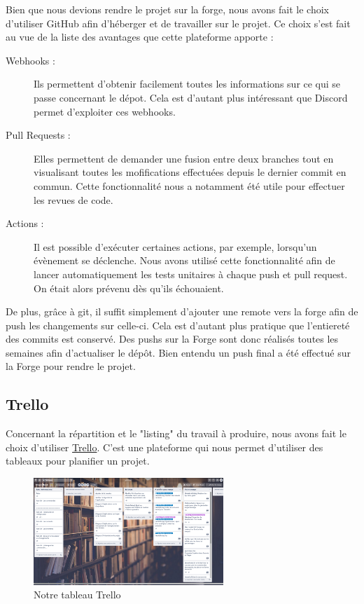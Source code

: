 			Bien que nous devions rendre le projet sur la forge, nous avons fait le choix d'utiliser GitHub afin d'héberger et de travailler sur le projet. Ce choix s'est fait au vue de la liste des avantages que cette plateforme apporte :

			\begin{description}
				\item[Webhooks :]{Ils permettent d'obtenir facilement toutes les informations sur ce qui se passe concernant le dépot. Cela est d'autant plus intéressant que Discord permet d'exploiter ces webhooks.}
				\item[Pull Requests :]{Elles permettent de demander une fusion entre deux branches tout en visualisant toutes les mofifications effectuées depuis le dernier commit en commun. Cette fonctionnalité nous a notamment été utile pour effectuer les revues de code.}
				\item[Actions :]{Il est possible d'exécuter certaines actions, par exemple, lorsqu'un évènement se déclenche. Nous avons utilisé cette fonctionnalité afin de lancer automatiquement les tests unitaires à chaque push et pull request. On était alors prévenu dès qu'ils échouaient.}
			\end{description}

			De plus, grâce à git, il suffit simplement d'ajouter une remote vers la forge afin de push les changements sur celle-ci. Cela est d'autant plus pratique que l'entiereté des commits est conservé. Des pushs sur la Forge sont donc réalisés toutes les semaines afin d'actualiser le dépôt. Bien entendu un push final a été effectué sur la Forge pour rendre le projet.

		\subsection{Trello}

			Concernant la répartition et le "listing" du travail à produire, nous avons fait le choix d'utiliser \href{https://trello.com}{Trello}. C'est une plateforme qui nous permet d'utiliser des tableaux pour planifier un projet.

			\begin{figure}[H]
				\centering\includegraphics[width=0.64\textwidth, keepaspectratio]{img/trello.png}
				\caption{Notre tableau Trello}
				\label{fig:trello}
			\end{figure}

